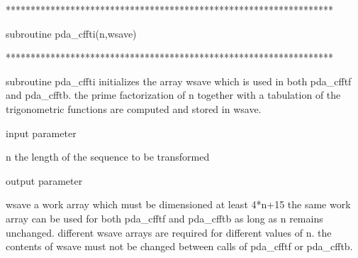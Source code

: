 \documentclass[11pt,twoside,nolof]{starlink}
\begin{document}

\begin{terminalv}
******************************************************************

subroutine pda_cffti(n,wsave)

******************************************************************

subroutine pda_cffti initializes the array wsave which is used in
both pda_cfftf and pda_cfftb. the prime factorization of n together with
a tabulation of the trigonometric functions are computed and
stored in wsave.

input parameter

n       the length of the sequence to be transformed

output parameter

wsave   a work array which must be dimensioned at least 4*n+15
        the same work array can be used for both pda_cfftf and pda_cfftb
        as long as n remains unchanged. different wsave arrays
        are required for different values of n. the contents of
        wsave must not be changed between calls of pda_cfftf or pda_cfftb.
\end{terminalv}
\end{document}
